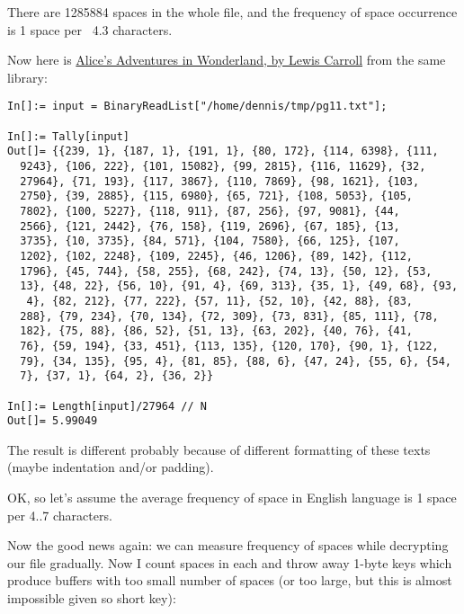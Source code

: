 There are 1285884 spaces in the whole file, and the frequency of space occurrence is 1 space per ~4.3 characters.

Now here is \href{http://www.gutenberg.org/ebooks/11}{Alice's Adventures in Wonderland, by Lewis Carroll} from the same library:

\begin{lstlisting}[caption=Mathematica,style=custommath]
In[]:= input = BinaryReadList["/home/dennis/tmp/pg11.txt"];

In[]:= Tally[input]
Out[]= {{239, 1}, {187, 1}, {191, 1}, {80, 172}, {114, 6398}, {111, 
  9243}, {106, 222}, {101, 15082}, {99, 2815}, {116, 11629}, {32, 
  27964}, {71, 193}, {117, 3867}, {110, 7869}, {98, 1621}, {103, 
  2750}, {39, 2885}, {115, 6980}, {65, 721}, {108, 5053}, {105, 
  7802}, {100, 5227}, {118, 911}, {87, 256}, {97, 9081}, {44, 
  2566}, {121, 2442}, {76, 158}, {119, 2696}, {67, 185}, {13, 
  3735}, {10, 3735}, {84, 571}, {104, 7580}, {66, 125}, {107, 
  1202}, {102, 2248}, {109, 2245}, {46, 1206}, {89, 142}, {112, 
  1796}, {45, 744}, {58, 255}, {68, 242}, {74, 13}, {50, 12}, {53, 
  13}, {48, 22}, {56, 10}, {91, 4}, {69, 313}, {35, 1}, {49, 68}, {93,
   4}, {82, 212}, {77, 222}, {57, 11}, {52, 10}, {42, 88}, {83, 
  288}, {79, 234}, {70, 134}, {72, 309}, {73, 831}, {85, 111}, {78, 
  182}, {75, 88}, {86, 52}, {51, 13}, {63, 202}, {40, 76}, {41, 
  76}, {59, 194}, {33, 451}, {113, 135}, {120, 170}, {90, 1}, {122, 
  79}, {34, 135}, {95, 4}, {81, 85}, {88, 6}, {47, 24}, {55, 6}, {54, 
  7}, {37, 1}, {64, 2}, {36, 2}}

In[]:= Length[input]/27964 // N
Out[]= 5.99049
\end{lstlisting}

The result is different probably because of different formatting of these texts (maybe indentation and/or padding).

OK, so let's assume the average frequency of space in English language is 1 space per 4..7 characters.

Now the good news again: we can measure frequency of spaces while decrypting our file gradually.
Now I count spaces in each  and throw away 1-byte keys which produce buffers with too small number of spaces (or too large, but this is almost impossible given so short key):

